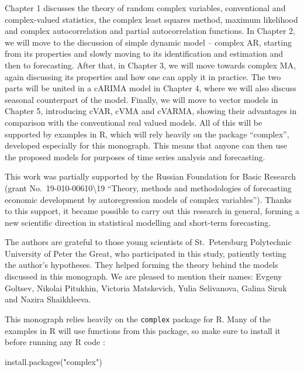 \documentclass[
]{book}
\newenvironment{Shaded}{\begin{snugshade}}{\end{snugshade}}
\newcommand{\FunctionTok}[1]{\textcolor[rgb]{0.00,0.00,0.00}{#1}}
\newcommand{\NormalTok}[1]{#1}
\newcommand{\StringTok}[1]{\textcolor[rgb]{0.31,0.60,0.02}{#1}}
\begin{document}
Chapter 1 discusses the theory of random complex variables, conventional and complex-valued statistics, the complex least squares method, maximum likelihood and complex autocorrelation and partial autocorrelation functions. In Chapter 2, we will move to the discussion of simple dynamic model -- complex AR, starting from its properties and slowly moving to its identification and estimation and then to forecasting. After that, in Chapter 3, we will move towards complex MA, again discussing its properties and how one can apply it in practice. The two parts will be united in a cARIMA model in Chapter 4, where we will also discuss seasonal counterpart of the model. Finally, we will move to vector models in Chapter 5, introducing cVAR, cVMA and cVARMA, showing their advantages in comparison with the conventional real valued models. All of this will be supported by examples in R, which will rely heavily on the package ``complex'', developed especially for this monograph. This means that anyone can then use the proposed models for purposes of time series analysis and forecasting.

This work was partially supported by the Russian Foundation for Basic Research (grant No.~19-010-00610\textbackslash19 ``Theory, methods and methodologies of forecasting economic development by autoregression models of complex variables''). Thanks to this support, it became possible to carry out this research in general, forming a new scientific direction in statistical modelling and short-term forecasting.

The authors are grateful to those young scientists of St.~Petersburg Polytechnic University of Peter the Great, who participated in this study, patiently testing the author's hypotheses. They helped forming the theory behind the models discussed in this monograph. We are pleased to mention their names: Evgeny Goltsev, Nikolai Pitukhin, Victoria Matskevich, Yulia Selivanova, Galina Siruk and Nazira Shaikhleeva.

This monograph relies heavily on the \texttt{complex} package for R. Many of the examples in R will use functions from this package, so make sure to install it before running any R code \citep{R-complex}:

\begin{Shaded}
\begin{Highlighting}[]
\FunctionTok{install.packages}\NormalTok{(}\StringTok{"complex"}\NormalTok{)}
\end{Highlighting}
\end{Shaded}
\end{document}
